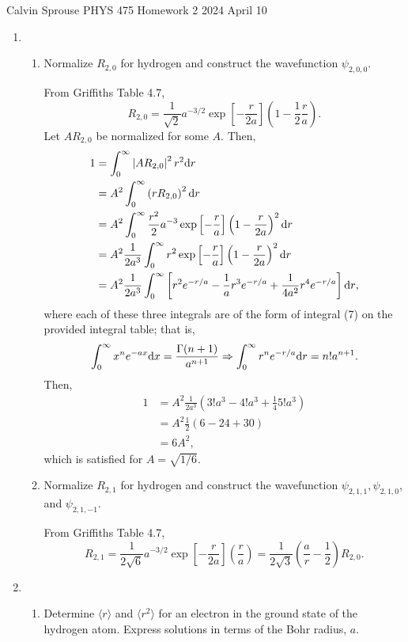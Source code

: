 \documentclass[a4paper, 12pt]{config/homework}
\begin{document}
\noindent
\hfill Calvin Sprouse \hfill PHYS 475 Homework 2 \hfill 2024 April 10 \hfill
\bigskip

\begin{enumerate}
\item \begin{enumerate}[label=(\alph*)]
\item Normalize \(R_{2,0}\) for hydrogen and construct the wavefunction \(\psi_{2,0,0}\). \bigskip

From Griffiths Table 4.7,
\[R_{2,0} = \frac{1}{\sqrt{2}}a^{-3/2}\exp\left[-\frac{r}{2a}\right]\left(1 - \frac{1}{2}\frac{r}{a}\right).\]
Let \(AR_{2,0}\) be normalized for some \(A\). Then,
\begin{align*}
1 &= \int_{0}^{\infty}{\left| AR_{2,0} \right|^2 r^2 \text{d}r}
\\&= A^2 \int_{0}^{\infty}{\left(rR_{2,0}\right)^2 \text{d}r}
\\&= A^2 \int_{0}^{\infty}{\frac{r^2}{2}a^{-3}\exp\left[-\frac{r}{a}\right]\left(1 - \frac{r}{2a}\right)^2 \text{d}r}
\\&= A^2 \frac{1}{2a^3}\int_{0}^{\infty}{r^2\exp\left[-\frac{r}{a}\right]\left(1-\frac{r}{2a}\right)^2 \text{d}r}
\\&= A^2 \frac{1}{2a^3} \int_{0}^{\infty}{\left[ r^2e^{-r/a} - \frac{1}{a}r^3e^{-r/a} + \frac{1}{4a^2}r^4e^{-r/a}\right] \text{d}r},
\end{align*}
where each of these three integrals are of the form of integral (7) on the provided integral table; that is,
\[\int_{0}^{\infty}{x^n e^{-ax} \text{d}x}=\frac{\Gamma(n+1)}{a^{n+1}}
\Rightarrow \int_{0}^{\infty}{r^n e^{-r/a} \text{d}r} = n! a^{n+1}.\]
Then,
\begin{align*}
1 &= A^2 \frac{1}{2a^3} \left(3!a^3 - 4!a^3 + \frac{1}{4}5!a^3\right)
\\&= A^2 \frac{1}{2} \left(6 - 24 + 30\right)
\\&= 6A^2,
\end{align*}
which is satisfied for \(A=\sqrt{1/6}\).

\item Normalize \(R_{2,1}\) for hydrogen and construct the wavefunction \(\psi_{2,1,1}, \psi_{2,1,0}\), and \(\psi_{2,1,-1}\). \bigskip

From Griffiths Table 4.7,
\[R_{2,1}
= \frac{1}{2\sqrt{6}}a^{-3/2}\exp\left[-\frac{r}{2a}\right]\left(\frac{r}{a}\right)
= \frac{1}{2\sqrt{3}}\left(\frac{a}{r}-\frac{1}{2}\right)R_{2,0}
.\]

\end{enumerate}
\pagebreak
\item \begin{enumerate}[label=(\alph*)]
\item Determine \(\langle r \rangle\) and \(\langle r^2 \rangle\) for an electron in the ground state of the hydrogen atom. Express solutions in terms of the Bohr radius, \(a\). \bigskip


\end{enumerate}
\end{enumerate}
\end{document}
